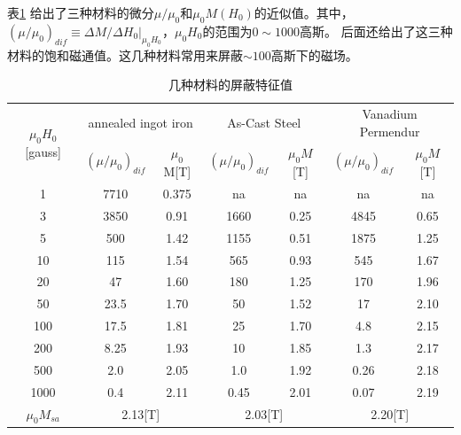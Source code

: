 表\ref{my-label} 给出了三种材料的微分$\mu/\mu_0$和$\mu_0M(H_0)$的近似值。其中，$(\mu/\mu_0)_{dif}\equiv \Delta M/ \Delta H_0 |_{\mu_0 H_0}$，$\mu_0 H_0$的范围为$0\sim 1000$高斯。
后面还给出了这三种材料的饱和磁通值。这几种材料常用来屏蔽$\sim 100$高斯下的磁场。

\begin{table}[]
\centering
\caption{几种材料的屏蔽特征值}
\label{my-label}
\begin{tabular}{|c|c|c|c|c|c|c|}
\hline
\multirow{2}{*}{$\mu_0 H_0$[gauss]} & \multicolumn{2}{c|}{annealed ingot iron} & \multicolumn{2}{c|}{As-Cast Steel} & \multicolumn{2}{c|}{Vanadium Permendur} \\ \cline{2-7}
                                  &$ (\mu/\mu_0)_{dif} $      & $\mu_0 $M[T]  & $(\mu/\mu_0)_{dif}   $ &$ \mu_0 M$[T]   &$ (\mu/\mu_0)_{dif}    $  & $\mu_0 M$[T]      \\ \hline
1                                 & 7710                   & 0.375           & na                  & na           & na                    & na              \\ \hline
3                                 & 3850                   & 0.91            & 1660                & 0.25         & 4845                  & 0.65            \\ \hline
5                                 & 500                    & 1.42            & 1155                & 0.51         & 1875                  & 1.25            \\ \hline
10                                & 115                    & 1.54            & 565                 & 0.93         & 545                   & 1.67            \\ \hline
20                                & 47                     & 1.60            & 180                 & 1.25         & 170                   & 1.96            \\ \hline
50                                & 23.5                   & 1.70            & 50                  & 1.52         & 17                    & 2.10            \\ \hline
100                               & 17.5                   & 1.81            & 25                  & 1.70         & 4.8                   & 2.15            \\ \hline
200                               & 8.25                   & 1.93            & 10                  & 1.85         & 1.3                   & 2.17            \\ \hline
500                               & 2.0                    & 2.05            & 1.0                 & 1.92         & 0.26                  & 2.18            \\ \hline
1000                              & 0.4                    & 2.11            & 0.45                & 2.01         & 0.07                  & 2.19            \\ \hline
$\mu_0 M_{sa} $                     & \multicolumn{2}{c|}{2.13[T]}             & \multicolumn{2}{c|}{2.03[T]}       & \multicolumn{2}{c|}{2.20[T]}            \\ \hline
\end{tabular}
\end{table}

